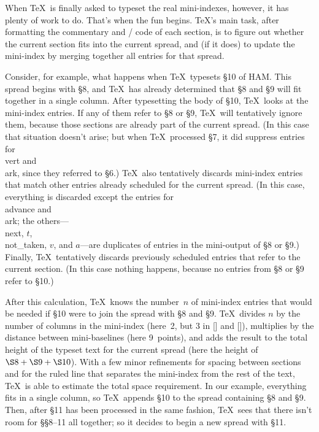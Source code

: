 When \TeX\ is finally asked to typeset the real mini-indexes, however,
it has plenty of work to do. That's when the fun begins.
\TeX's main task, after formatting the commentary and \CEE/ code
of each section, is to figure out whether the current section fits into the
current spread, and (if it does) to update the
mini-index by merging together all entries for that spread.

Consider, for example, what happens when \TeX\ typesets
\S10 of {\sc HAM}. This spread begins
with \S8, and \TeX\ has already determined that \S8 and \S9 will fit
together in a single column. After typesetting the body of \S10, \TeX\
looks at the mini-index entries. If any of them refer to \S8 or \S9, \TeX\ will
tentatively ignore them, because those sections are already part of the
current spread. (In this case that situation doesn't arise; but
when \TeX\ processed \S7, it did suppress entries for \\{vert} and \\{ark},
since they referred to \S6.) \TeX\ also tentatively discards mini-index
entries that match other entries already scheduled for the current spread.
(In this case, everything is discarded except the entries
for \\{advance} and \\{ark}; the
others---\\{next}, $t$, \\{not\_taken}, $v$, and $a$---are duplicates of
entries in the mini-output of \S8 or \S9.) Finally, \TeX\ tentatively
discards previously scheduled entries that refer to the current section.
(In this case nothing happens, because no entries from \S8 or \S9 refer to
\S10.)

After this calculation, \TeX\ knows the number~$n$ of mini-index entries
that would be needed if \S10 were to join the spread with \S8 and \S9. \TeX\
divides $n$ by the number of columns in the mini-index (here~2, but 3 in
[\TTP] and [\SGB]), multiplies by the distance between mini-baselines (here
9~points), and adds the result to the total height of the typeset text for
the current spread (here the height of $\S8+\S9+\S10$). With a few minor
refinements for spacing between sections and for the ruled line that
separates the mini-index from the rest of the text, \TeX\ is able to
estimate the total space requirement. In our example, everything fits in a
single column, so \TeX\ appends \S10 to the spread containing \S8 and \S9.
Then, after \S11 has been processed in the same fashion, \TeX\ sees that
there isn't room for \S\S8--11 all together; so it decides to begin a new
spread with \S11.

